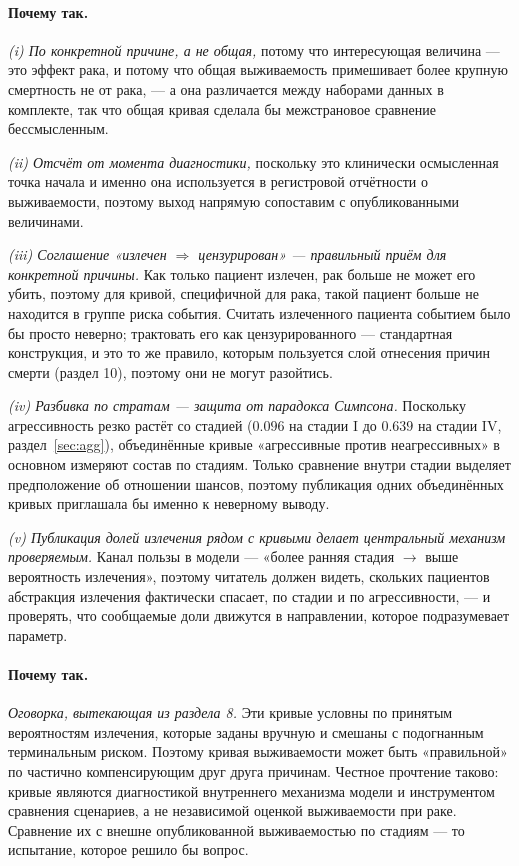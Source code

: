 \documentclass[12pt,a4paper]{article}
\newcommand{\why}[1]{\paragraph{Почему так.} #1}
\begin{document}
\why{\emph{(i) По конкретной причине, а не общая,} потому что интересующая величина --- это эффект рака, и
потому что общая выживаемость примешивает более крупную смертность не от рака, --- а она различается между
наборами данных в комплекте, так что общая кривая сделала бы межстрановое сравнение бессмысленным.

\emph{(ii) Отсчёт от момента диагностики,} поскольку это клинически осмысленная точка начала и именно она
используется в регистровой отчётности о выживаемости, поэтому выход напрямую сопоставим с опубликованными
величинами.

\emph{(iii) Соглашение «излечен $\Rightarrow$ цензурирован» --- правильный приём для конкретной причины.} Как
только пациент излечен, рак больше не может его убить, поэтому для кривой, специфичной для рака, такой
пациент больше не находится в группе риска события. Считать излеченного пациента событием было бы просто
неверно; трактовать его как цензурированного --- стандартная конструкция, и это то же правило, которым
пользуется слой отнесения причин смерти (раздел 10), поэтому они не могут разойтись.

\emph{(iv) Разбивка по стратам --- защита от парадокса Симпсона.} Поскольку агрессивность резко растёт со
стадией ($0.096$ на стадии I до $0.639$ на стадии IV, раздел~\ref{sec:agg}), объединённые кривые
«агрессивные против неагрессивных» в основном измеряют состав по стадиям. Только сравнение внутри стадии
выделяет предположение об отношении шансов, поэтому публикация одних объединённых кривых приглашала бы
именно к неверному выводу.

\emph{(v) Публикация долей излечения рядом с кривыми делает центральный механизм проверяемым.} Канал пользы
в модели --- «более ранняя стадия $\rightarrow$ выше вероятность излечения», поэтому читатель должен видеть,
скольких пациентов абстракция излечения фактически спасает, по стадии и по агрессивности, --- и проверять,
что сообщаемые доли движутся в направлении, которое подразумевает параметр.}

\why{\emph{Оговорка, вытекающая из раздела 8.} Эти кривые условны по принятым вероятностям излечения,
которые заданы вручную и смешаны с подогнанным терминальным риском. Поэтому кривая выживаемости может быть
«правильной» по частично компенсирующим друг друга причинам. Честное прочтение таково: кривые являются
диагностикой внутреннего механизма модели и инструментом сравнения сценариев, а не независимой оценкой
выживаемости при раке. Сравнение их с внешне опубликованной выживаемостью по стадиям --- то испытание,
которое решило бы вопрос.}
\end{document}
